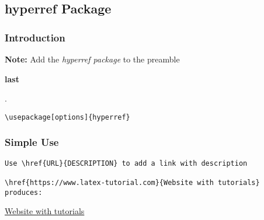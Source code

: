 \documentclass[class=article, crop=false, titlepage, twoside, multi={itemize, figure, verbatim}, float=false]{standalone}
\title{}  %
\begin{document}

\ifstandalone
\maketitle %
\clearpage
\tableofcontents %
\clearpage
\fi

\subsection[hyperref Package]{\LARGE hyperref Package}

\subsubsection[Introduction]{\Large Introduction}

\textbf{Note:} Add the \textit{hyperref package} to the preamble\begin{large}\textbf{ last}\end{large}.	

\begin{verbatim}\usepackage[options]{hyperref}\end{verbatim}

\subsubsection[Simple Use]{\Large Simple Use}
\begin{verbatim}Use \href{URL}{DESCRIPTION} to add a link with description

\href{https://www.latex-tutorial.com}{Website with tutorials}
produces:
\end{verbatim}
\href{https://www.latex-tutorial.com}{Website with tutorials}
\end{document}
